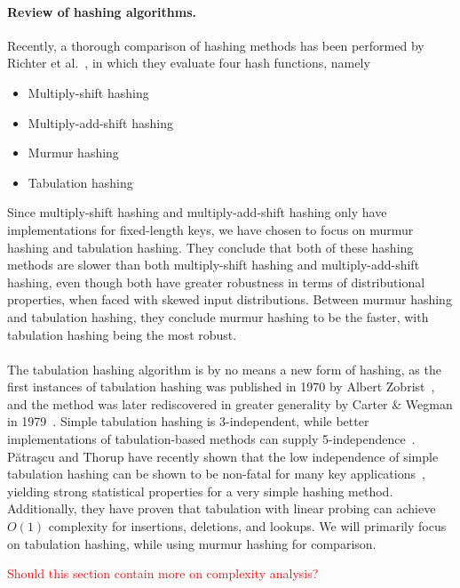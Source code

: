 \documentclass[11pt]{article} %
\begin{document}
\paragraph{Review of hashing algorithms.}
Recently, a thorough comparison of hashing methods has been performed by Richter et al.~\cite{RAD15}, in which they evaluate four hash functions, namely
\begin{itemize}
\item Multiply-shift hashing
\item Multiply-add-shift hashing
\item Murmur hashing
\item Tabulation hashing
\end{itemize}
Since multiply-shift hashing and multiply-add-shift hashing only have implementations for fixed-length keys, we have chosen to focus on murmur hashing and tabulation hashing. They conclude that both of these hashing methods are slower than both multiply-shift hashing and multiply-add-shift hashing, even though both have greater robustness in terms of distributional properties, when faced with skewed input distributions. Between murmur hashing and tabulation hashing, they conclude murmur hashing to be the faster, with tabulation hashing being the most robust. \\
\\
The tabulation hashing algorithm is by no means a new form of hashing, as the first instances of tabulation hashing was published in 1970 by Albert Zobrist~\cite{Zobrist}, and the method was later rediscovered in greater generality by Carter \& Wegman in 1979~\cite{WC79}. Simple tabulation hashing is 3-independent, while better implementations of tabulation-based methods can supply 5-independence~\cite{TZ09}. Pătraşcu and Thorup have recently shown that the low independence of simple tabulation hashing can be shown to be non-fatal for many key applications~\cite{PT11}, yielding strong statistical properties for a very simple hashing method. Additionally, they have proven that tabulation with linear probing can achieve $O(1)$ complexity for insertions, deletions, and lookups. We will primarily focus on tabulation hashing, while using murmur hashing for comparison. 

\textcolor{red}{Should this section contain more on complexity analysis?}\\
\\
\end{document}
